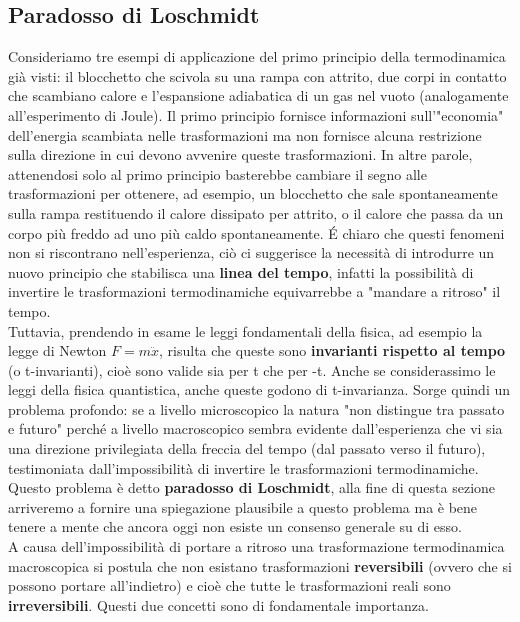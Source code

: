 \documentclass[
10pt, %
a4paper, %
oneside, %
headinclude,footinclude, %
BCOR5mm, %
]{scrartcl}
\begin{document}
\subsection{Paradosso di Loschmidt}
Consideriamo tre esempi di applicazione del primo principio della termodinamica già visti: il blocchetto che scivola su una rampa con attrito, due corpi in contatto che scambiano calore e l'espansione adiabatica di un gas nel vuoto (analogamente all'esperimento di Joule). Il primo principio fornisce informazioni sull'"economia" dell'energia scambiata nelle trasformazioni ma non fornisce alcuna restrizione sulla direzione in cui devono avvenire queste trasformazioni. In altre parole, attenendosi solo al primo principio basterebbe cambiare il segno alle trasformazioni per ottenere, ad esempio, un blocchetto che sale spontaneamente sulla rampa restituendo il calore dissipato per attrito, o il calore che passa da un corpo più freddo ad uno più caldo spontaneamente. \'{E} chiaro che questi fenomeni non si riscontrano nell'esperienza, ciò ci suggerisce la necessità di introdurre un nuovo principio che stabilisca una \textbf{linea del tempo}, infatti la possibilità di invertire le trasformazioni termodinamiche equivarrebbe a "mandare a ritroso" il tempo.\\
Tuttavia, prendendo in esame le leggi fondamentali della fisica, ad esempio la legge di Newton \(F = m \ddot{x}\), risulta che queste sono \textbf{invarianti rispetto al tempo} (o t-invarianti), cioè sono valide sia per t che per -t. Anche se considerassimo le leggi della fisica quantistica, anche queste godono di t-invarianza. Sorge quindi un problema profondo: se a livello microscopico la natura "non distingue tra passato e futuro" perché a livello macroscopico sembra evidente dall'esperienza che vi sia una direzione privilegiata della freccia del tempo (dal passato verso il futuro), testimoniata dall'impossibilità di invertire le trasformazioni termodinamiche. Questo problema è detto \textbf{paradosso di Loschmidt}, alla fine di questa sezione arriveremo a fornire una spiegazione plausibile a questo problema ma è bene tenere a mente che ancora oggi non esiste un consenso generale su di esso.\\
A causa dell'impossibilità di portare a ritroso una trasformazione termodinamica macroscopica si postula che non esistano trasformazioni \textbf{reversibili} (ovvero che si possono portare all'indietro) e cioè che tutte le trasformazioni reali sono \textbf{irreversibili}. Questi due concetti sono di fondamentale importanza.\\
\end{document}
